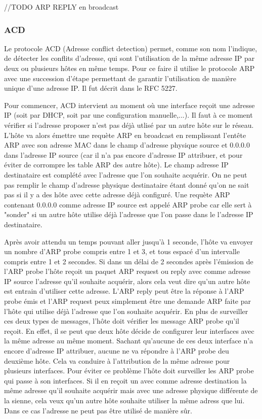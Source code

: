 //TODO ARP REPLY en broadcast

\subsubsection{ACD} Le protocole ACD (Adresse conflict detection) permet, comme
son nom l'indique, de détecter les conflits d'adresse, qui sont l'utilisation
de la même adresse IP par deux ou plusieurs hôtes en même temps. Pour ce faire
il utilise le protocole ARP avec une succession d'étape permettant de garantir
l'utilisation de manière unique d'une adresse IP. Il fut décrit dans le RFC 5227\cite{url-RFC-ACD}.

Pour commencer, ACD intervient au moment où une interface reçoit une adresse IP
(soit par DHCP, soit par une configuration manuelle,...). Il faut à ce moment vérifier si
l'adresse proposer n'est pas déjà utlisé par un autre hôte sur le réseau.
L'hôte va alors émettre une requète ARP en broadcast en remplissant l'entête
ARP avec son adresse MAC dans le champ d'adresse physique source et 0.0.0.0
dans l'adresse IP source (car il n'a pas encore d'adresse IP attribuer, et pour
éviter de corrompre les table ARP des autre hôte). Le champ adresse IP
destinataire est complété avec l'adresse que l'on souhaite acquérir. On ne peut
pas remplir le champ d'adresse physique destinataire étant donné qu'on ne sait
pas si il y a des hôte avec cette adresse déjà configuré.  Une requète ARP
contenant 0.0.0.0 comme adresse IP source est appelé ARP probe car elle sert à
"sonder" si un autre hôte utilise déjà l'adresse que l'on passe dans le
l'adresse IP destinataire.

Après avoir attendu un temps pouvant aller jusqu'à 1 seconde, l'hôte va envoyer
un nombre d'ARP probe compris entre 1 et 3, et tous espacé d'un intervalle
compris entre 1 et 2 secondes.  Si dans un délai de 2 secondes après l'émission
de l'ARP probe l'hôte reçoit un paquet ARP request ou reply avec comme adresse
IP source l'adresse qu'il souhaite acquérir, alors cela veut dire qu'un autre
hôte est entrain d'utiliser cette adresse. L'ARP reply peut être la réponse à
l'ARP probe émis et l'ARP request peux simplement être une demande ARP faite
par l'hôte qui utilise déjà l'adresse que l'on souhaite acquérir.  En plus de
surveiller ces deux types de messages, l'hôte doit vérifier les message ARP
probe qu'il reçoit. En effet, il se peut que deux hôte décide de configurer
leur interfaces avec la même adresse au même moment. Sachant qu'aucune de ces
deux interface n'a encore d'adresse IP attribuer, aucune ne va répondre à l'ARP
probe deu deuxième hôte. Cela va conduire à l'attribution de la même adresse
pour plusieurs interfaces. Pour éviter ce problème l'hôte doit surveiller les
ARP probe qui passe à son interfaces. Si il en reçoit un avec comme adresse
destination la même adresse qu'il souhaite acquérir mais avec une adresse
physique différente de la sienne, cela veux qu'un autre hôte souhaite utiliser
la même adress que lui. Dans ce cas l'adresse ne peut pas être utilisé de manière sûr.

